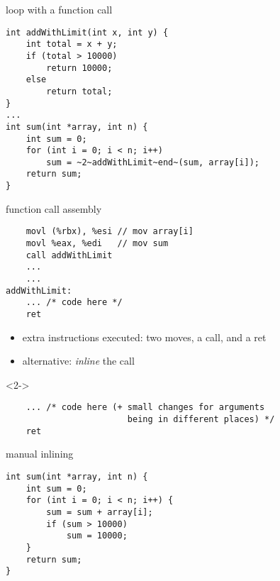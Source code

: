 \begin{frame}[fragile,label=inliningMot]{loop with a function call}
\begin{lstlisting}
int addWithLimit(int x, int y) {
    int total = x + y;
    if (total > 10000)
        return 10000;
    else
        return total;
}
...
int sum(int *array, int n) {
    int sum = 0;
    for (int i = 0; i < n; i++)
        sum = ~2~addWithLimit~end~(sum, array[i]);
    return sum;
}
\end{lstlisting}
\end{frame}

\begin{frame}[fragile,label=inlining]{function call assembly}
\begin{lstlisting}
    movl (%rbx), %esi // mov array[i]
    movl %eax, %edi   // mov sum
    call addWithLimit
    ...
    ...
addWithLimit:
    ... /* code here */
    ret
\end{lstlisting}
    \begin{itemize}
        \item extra instructions executed: two moves, a call, and a ret
        \item<2-> alternative: \textit{inline} the call
    \end{itemize}
\begin{visibleenv}<2->
\begin{lstlisting}
    ... /* code here (+ small changes for arguments
                        being in different places) */
    ret
\end{lstlisting}
\end{visibleenv}
\end{frame}

\begin{frame}[fragile,label=manualInlining]{manual inlining}
\begin{lstlisting}
int sum(int *array, int n) {
    int sum = 0;
    for (int i = 0; i < n; i++) {
        sum = sum + array[i];
        if (sum > 10000)
            sum = 10000;
    }
    return sum;
}

\end{lstlisting}
\end{frame}


